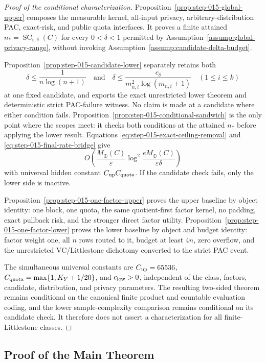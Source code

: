 \begin{proof}[Proof of the conditional characterization]
Proposition~\ref{prop:step-015-global-upper} composes the measurable
kernel, all-input privacy, arbitrary-distribution PAC, exact-risk, and
public quota interfaces.  It proves a finite attained
\(n_*=\operatorname{SC}_{\varepsilon,\delta}(C)\) for every
\(0<\delta<1\) permitted by
Assumption~\ref{assump:global-privacy-range}, without invoking
Assumption~\ref{assump:candidate-delta-budget}.

Proposition~\ref{prop:step-015-candidate-lower} separately retains both
\[
\delta\le\frac1{n\log(n+1)}
\quad\text{and}\quad
\delta\le
\frac{c_\delta}{m_{n,i}^2\log(m_{n,i}+1)}
\quad(1\le i\le k)
\]
at one fixed candidate, and exports the exact unrestricted lower
theorem and deterministic strict PAC-failure witness.  No claim is
made at a candidate where either condition fails.
Proposition~\ref{prop:step-015-conditional-sandwich} is the only point
where the scopes meet: it checks both conditions at the attained
\(n_*\) before applying the lower result.  Equations
\eqref{eq:step-015-exact-ceiling-removal} and
\eqref{eq:step-015-final-rate-bridge} give
\[
O\!\left(
\frac{M_{\oplus}(C)}{\varepsilon}
\log^2\!\frac{eM_{\oplus}(C)}{\varepsilon\delta}
\right)
\]
with universal hidden constant \(C_{\rm up}C_{\rm quota}\).  If the
candidate check fails, only the lower side is inactive.

Proposition~\ref{prop:step-015-one-factor-upper} proves the upper
baseline by object identity: one block, one quota, the same
quotient-first factor kernel, no padding, exact pullback risk, and the
stronger direct factor utility.
Proposition~\ref{prop:step-015-one-factor-lower} proves the lower
baseline by object and budget identity: factor weight one, all \(n\)
rows routed to it, budget at least \(4n\), zero overflow, and the
unrestricted VC/Littlestone dichotomy converted to the strict PAC
event.

The simultaneous universal constants are \(C_{\rm up}=65536\),
\(C_{\rm quota}=\max\{1,K_Y+1/20\}\), and \(c_{\rm low}>0\), independent
of the class, factors, candidate, distribution, and privacy parameters.
The resulting two-sided theorem remains conditional on the canonical
finite product and countable evaluation coding, and the lower
sample-complexity comparison remains conditional on its candidate
check.  It therefore does not assert a characterization for all
finite-Littlestone classes.
\end{proof}

\subsection{Proof of the Main Theorem}
\label{app:main-theorem-proof}

